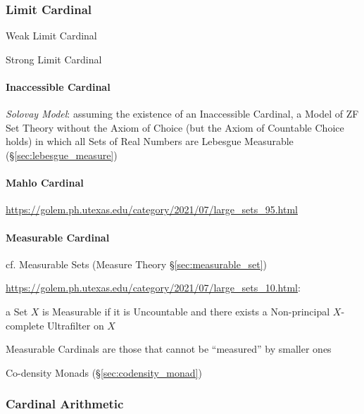 \subsubsection{Limit Cardinal}\label{sec:limit_cardinal}

Weak Limit Cardinal

Strong Limit Cardinal



\paragraph{Inaccessible Cardinal}\label{sec:inaccessible_cardinal}\hfill

\emph{Solovay Model}: assuming the existence of an Inaccessible Cardinal, a
Model of ZF Set Theory without the Axiom of Choice (but the Axiom of Countable
Choice holds) in which all Sets of Real Numbers are Lebesgue Measurable
(\S\ref{sec:lebesgue_measure})



\paragraph{Mahlo Cardinal}\label{sec:mahlo_cardinal}\hfill

\url{https://golem.ph.utexas.edu/category/2021/07/large_sets_95.html}



\paragraph{Measurable Cardinal}\label{sec:measurable_cardinal}\hfill

cf. Measurable Sets (Measure Theory \S\ref{sec:measurable_set})

\url{https://golem.ph.utexas.edu/category/2021/07/large_sets_10.html}:

a Set $X$ is Measurable if it is Uncountable and there exists a Non-principal
$X$-complete Ultrafilter on $X$

Measurable Cardinals are those that cannot be ``measured'' by smaller ones

Co-density Monads (\S\ref{sec:codensity_monad})



\subsubsection{Cardinal Arithmetic}\label{sec:cardinal_arithmetic}

